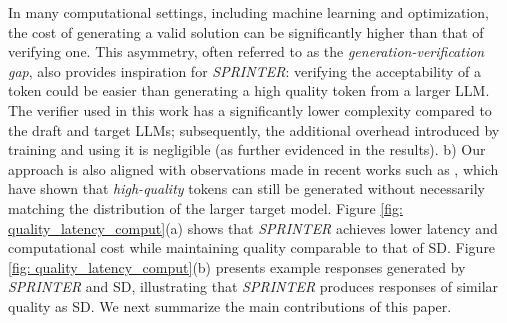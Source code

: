 \documentclass{article}
\newcommand{\revision}[1]{{\color{black} #1}}
\theoremstyle{plain}
\theoremstyle{definition}
\theoremstyle{remark}
\begin{document}
In many computational settings, including machine learning and optimization, the cost of generating a valid solution can be significantly higher than that of verifying one. This asymmetry, often referred to as the \textit{generation-verification gap}, also provides inspiration for \textit{SPRINTER}: verifying the acceptability of a token could be  easier than generating a high quality token from a larger LLM. The verifier used in this work has a significantly lower complexity compared to the draft and target LLMs; subsequently, the additional overhead introduced by training and using it is negligible (as further evidenced in the results). b) Our approach is also aligned with observations made in recent works such as \cite{judge,melcer2024approximately}, which have shown that \textit{high-quality} tokens can still be generated without necessarily matching the distribution of the larger target model. \revision{Figure \ref{fig: quality_latency_comput}(a) shows that \textit{SPRINTER} achieves lower latency and computational cost while maintaining quality comparable to that of SD. Figure \ref{fig: quality_latency_comput}(b) presents example responses generated by \textit{SPRINTER} and SD, illustrating that \textit{SPRINTER} produces responses of similar quality as SD.} We next summarize the main contributions of this paper.
\end{document}
